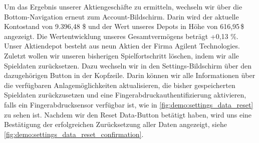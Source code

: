 \documentclass[a4paper]{article}
\begin{document}
Um das Ergebnis unserer Aktiengeschäfte zu ermitteln, wechseln wir über die Bottom-Navigation erneut zum Account-Bildschirm. Darin wird der aktuelle Kontostand von 9.396,48 \$ und der Wert unseres Depots in Höhe von 616,95\,\$ angezeigt. Die Wertentwicklung unseres Gesamtvermögens beträgt +0,13 \%. Unser Aktiendepot besteht aus neun Aktien der Firma Agilent Technologies.\newline
Zuletzt wollen wir unseren bisherigen Spielfortschritt löschen, indem wir alle Spieldaten zurücksetzen. Dazu wechseln wir in den Settings-Bildschirm über den dazugehörigen Button in der Kopfzeile. Darin können wir alle Informationen über die verfügbaren Anlagemöglichkeiten aktualisieren, die bisher gespeicherten Spieldaten zurückzusetzen und eine Fingerabdruckauthentifizierung aktivieren, falls ein Fingerabdrucksensor verfügbar ist, wie in \autoref{fig:demo:settings_data_reset} zu sehen ist. Nachdem wir den Reset Data-Button betätigt haben, wird uns eine Bestätigung der erfolgreichen Zurücksetzung aller Daten angezeigt, siehe \autoref{fig:demo:settings_data_reset_confirmation}.
\end{document}
